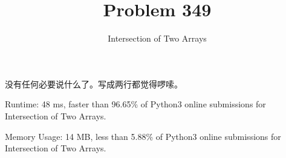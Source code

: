 \documentclass[UTF8]{ctexart}
\title{Problem 349}
\author{Intersection of Two Arrays}
\begin{document}
\maketitle

没有任何必要说什么了。写成两行都觉得啰嗦。

Runtime: 48 ms, faster than 96.65\% of Python3 online submissions for Intersection of Two Arrays.

Memory Usage: 14 MB, less than 5.88\% of Python3 online submissions for Intersection of Two Arrays.
\end{document}
